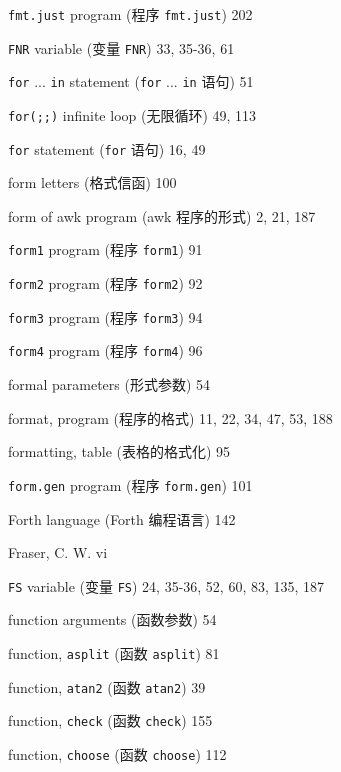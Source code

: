 \begin{multicols}{2}
\hangindent=2pc  \verb'fmt.just' program (程序 \verb'fmt.just') 202

\hangindent=2pc  \verb'FNR' variable (变量 \verb'FNR') 33, 35-36, 61

\hangindent=2pc  \verb'for' ... \verb'in' statement (\verb'for'
... \verb'in' 语句) 51

\hangindent=2pc  \verb'for(;;)' infinite loop (无限循环) 49, 113

\hangindent=2pc  \verb'for' statement (\verb'for' 语句) 16, 49

\hangindent=2pc  form letters (格式信函) 100

\hangindent=2pc  form of awk program (awk 程序的形式) 2, 21, 187

\hangindent=2pc  \verb'form1' program (程序 \verb'form1') 91

\hangindent=2pc  \verb'form2' program (程序 \verb'form2') 92

\hangindent=2pc  \verb'form3' program (程序 \verb'form3') 94

\hangindent=2pc  \verb'form4' program (程序 \verb'form4') 96

\hangindent=2pc  formal parameters (形式参数) 54

\hangindent=2pc  format, program (程序的格式)
11, 22, 34, 47, 53, 188

\hangindent=2pc  formatting, table (表格的格式化) 95

\hangindent=2pc  \verb'form.gen' program (程序 \verb'form.gen') 101

\hangindent=2pc  Forth language (Forth 编程语言) 142

\hangindent=2pc  Fraser, C. W. vi

\hangindent=2pc  \verb'FS' variable (变量 \verb'FS')
24, 35-36, 52, 60, 83, 135, 187

\hangindent=2pc  function arguments (函数参数) 54

\hangindent=2pc  function, \verb'asplit' (函数 \verb'asplit') 81

\hangindent=2pc  function, \verb'atan2' (函数 \verb'atan2') 39

\hangindent=2pc  function, \verb'check' (函数 \verb'check') 155

\hangindent=2pc  function, \verb'choose' (函数 \verb'choose') 112


\end{multicols}
